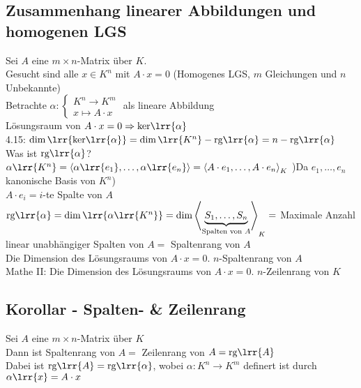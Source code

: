 \subsection{Zusammenhang linearer Abbildungen und homogenen LGS}
	Sei $A$ eine $m\times n$-Matrix über $K$.\\
	Gesucht sind alle $x\in K^n$ mit $A\cdot x=0$ (Homogenes LGS, $m$ Gleichungen und $n$ Unbekannte)\\
	Betrachte $\alpha:\begin{cases}K^n\rightarrow K^m\\x\mapsto A\cdot x\end{cases}$ als lineare Abbildung\\
	Lösungsraum von $A\cdot x=0 \Rightarrow \mbox{ker}\lrr{\alpha}$\\
	4.15: $\dim\lrr{\mbox{ker}\lrr{\alpha}}=\dim\lrr{K^n}-\mbox{rg}\lrr{\alpha}=n-\mbox{rg}\lrr{\alpha}$\\
	Was ist $\mbox{rg}\lrr{\alpha}$?\\
	$\alpha\lrr{K^n}=\left\langle\alpha\lrr{e_1},\dots,\alpha\lrr{e_n}\right\rangle=\left\langle A\cdot e_1,\dots, A\cdot e_n\right\rangle_K$ )Da $e_1,\dots,e_n$ kanonische Basis von $K^n$)\\
	$A\cdot e_i=i$-te Spalte von $A$\\
	$\mbox{rg}\lrr{\alpha}=\dim\lrr{\alpha\lrr{K^n}}=\dim\left\langle \underbrace{S_1,\dots,S_n}_{\mbox{\scriptsize Spalten von }\scriptstyle A}\right\rangle_K=$ Maximale Anzahl linear unabhängiger Spalten von $A =$ Spaltenrang von $A$\\
	Die Dimension des Lösungsraums von $A\cdot x=0$. $n$-Spaltenrang von $A$\\
	Mathe II: Die Dimension des Lösungsraums von $A\cdot x=0$. $n$-Zeilenrang von $K$

\subsection{Korollar - Spalten- \& Zeilenrang}
	Sei $A$ eine $m\times n$-Matrix über $K$\\
	Dann ist Spaltenrang von $A =$ Zeilenrang von $A=\mbox{rg}\lrr{A}$\\
	Dabei ist $\mbox{rg}\lrr{A}=\mbox{rg}\lrr{\alpha}$, wobei $\alpha:K^n\rightarrow K^m$ definert ist durch $\alpha\lrr{x}=A\cdot x$
